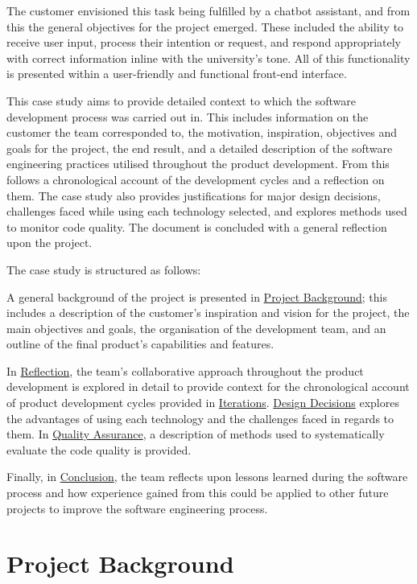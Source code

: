 \documentclass{l3proj}
\begin{document}
The customer envisioned this task being fulfilled by a chatbot assistant, and from this the general objectives for the project emerged. These included the ability to receive user input, process their intention or request, and respond appropriately with correct information inline with the university's tone. All of this functionality is presented within a user-friendly and functional front-end interface.

This case study aims to provide detailed context to which the software development process was carried out in. This includes information on the customer the team corresponded to, the motivation, inspiration, objectives and goals for the project, the end result, and a detailed description of the software engineering practices utilised throughout the product development. From this follows a chronological account of the development cycles and a reflection on them. The case study also provides justifications for major design decisions, challenges faced while using each technology selected, and explores methods used to monitor code quality. The document is concluded with a general reflection upon the project.

The case study is structured as follows:

A general background of the project is presented in \hyperref[sec:projectbg]{Project Background}; this includes a description of the customer's inspiration and vision for the project, the main objectives and goals, the organisation of the development team, and an outline of the final product's capabilities and features.

In \hyperref[sec:reflection]{Reflection}, the team's collaborative approach throughout the product development is explored in detail to provide context for the chronological account of product development cycles provided in  \hyperref[subsec:iterations]{Iterations}. \hyperref[subsec:designdecisions]{Design Decisions} explores the advantages of using each technology and the challenges faced in regards to them. In \hyperref[subsec:qa]{Quality Assurance}, a description of methods used to systematically evaluate the code quality is provided.

Finally, in \hyperref[sec:conclusion]{Conclusion}, the team reflects upon lessons learned during the software process and how experience gained from this could be applied to other future projects to improve the software engineering process.

\section{Project Background}
\label{sec:projectbg}
\end{document}
